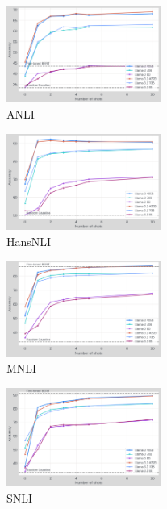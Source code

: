\begin{figure}[t]
    \centering
    \includegraphics[width=0.45\textwidth]{nli_plots/anli.png}
    \caption{ANLI}
    \label{fig:anli}
\end{figure}

\begin{figure}[t]
    \centering
    \includegraphics[width=0.45\textwidth]{nli_plots/hansnli.png}
    \caption{HansNLI}
    \label{fig:hansnli}
\end{figure}

\begin{figure}[t]
    \centering
    \includegraphics[width=0.45\textwidth]{nli_plots/mnli_matched.png}
    \caption{MNLI}
    \label{fig:mnli}
\end{figure}

\begin{figure}[t]
    \centering
    \includegraphics[width=0.45\textwidth]{nli_plots/snli.png}
    \caption{SNLI}
    \label{fig:snli}
\end{figure}

